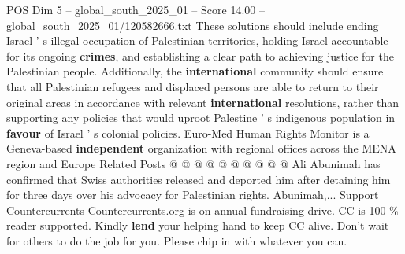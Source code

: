 \begin{textsample}{POS Dim 5 – global\_south\_2025\_01 – Score 14.00 – global\_south\_2025\_01/120582666.txt}
These solutions should include ending Israel ' s illegal occupation of Palestinian territories, holding Israel accountable for its ongoing \textbf{crimes}, and establishing a clear path to achieving justice for the Palestinian people.
Additionally, the \textbf{international} community should ensure that all Palestinian refugees and displaced persons are able to return to their original areas in accordance with relevant \textbf{international} resolutions, rather than supporting any policies that would uproot Palestine ' s indigenous population in \textbf{favour} of Israel ' s colonial policies.
Euro-Med Human Rights Monitor is a Geneva-based \textbf{independent} organization with regional offices across the MENA region and Europe Related Posts @ @ @ @ @ @ @ @ @ @ Ali Abunimah has confirmed that Swiss authorities released and deported him after detaining him for three days over his advocacy for Palestinian rights.
Abunimah,...
Support Countercurrents Countercurrents.org is on annual fundraising drive.
CC is 100 \% reader supported.
Kindly \textbf{lend} your helping hand to keep CC alive.
Don't wait for others to do the job for you.
Please chip in with whatever you can.

\end{textsample}
